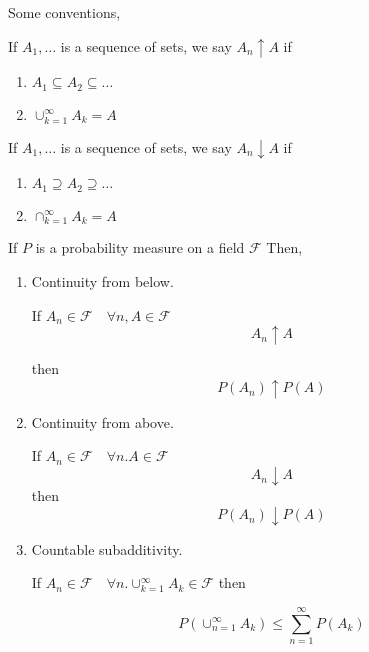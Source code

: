 \documentclass[11pt,fleqn]{book} %
\begin{document}
Some conventions, 

If $A_1, \dots$ is a sequence of sets, we say $A_n \uparrow A$ if 

\begin{enumerate}
 	\item $A_1 \subseteq A_2 \subseteq \dots$
 	\item $\displaystyle \cup^\infty_{k=1} A_k = A$
 \end{enumerate} 
\vspace{5mm}
 If $A_1, \dots$ is a sequence of sets, we say $A_n \downarrow A$ if 

\begin{enumerate}
 	\item $A_1 \supseteq A_2 \supseteq \dots$
 	\item $\displaystyle \cap^\infty_{k=1} A_k = A$
 \end{enumerate} 

 \begin{theorem}
 	If $P$ is a probability measure on a field $\mathscr{F}$ Then, 

 	\begin{enumerate}
 		\item Continuity from below.

 		If $A_n \in \mathscr{F} \quad \forall n, A \in \mathscr{F}$
 		$$ A_n \uparrow A$$

 		then $$P(A_n) \uparrow P(A)$$

 		\item Continuity from above.

 		If $A_n \in \mathscr{F} \quad \forall n. A \in \mathscr{F}$  
 			$$A_n \downarrow A$$
 		 then $$P(A_n) \downarrow P(A)$$

 		\item Countable subadditivity.

 		If $A_n \in \mathscr{F} \quad \forall n. \displaystyle \cup^\infty_{k=1} A_k \in \mathscr{F}$ then 

 		$$P(\displaystyle \cup^\infty_{n=1} A_k) \leq \displaystyle \sum^\infty_{n=1} P(A_k)$$
 	\end{enumerate}
 \end{theorem}
\end{document}
